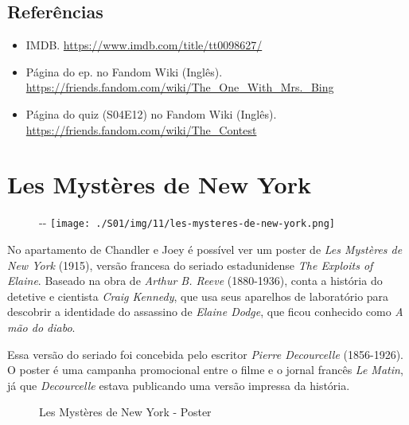 \hypertarget{referuxeancias-1}{%
\subsection{Referências}\label{referuxeancias-1}}

\begin{itemize}
\tightlist
\item
  \sloppy IMDB. \url{https://www.imdb.com/title/tt0098627/}
\item
  \sloppy Página do ep. no Fandom Wiki (Inglês). \url{https://friends.fandom.com/wiki/The_One_With_Mrs._Bing}
\item
  \sloppy Página do quiz (S04E12) no Fandom Wiki (Inglês). \url{https://friends.fandom.com/wiki/The_Contest}
\end{itemize}

\hypertarget{les-mystuxe8res-de-new-york}{%
\section{Les Mystères de New York}\label{les-mystuxe8res-de-new-york}}

\begin{figure}[!ht]
  \begin{adjustwidth}{-\oddsidemargin-1in}{-\rightmargin}
    \centering
    \texttt{[image: ./S01/img/11/les-mysteres-de-new-york.png]}
  \end{adjustwidth}
\end{figure}

No apartamento de Chandler e Joey é possível ver um poster de \emph{Les
Mystères de New York} (1915), versão francesa do seriado estadunidense
\emph{The Exploits of Elaine}. Baseado na obra de \emph{Arthur B. Reeve}
(1880-1936), conta a história do detetive e cientista \emph{Craig
Kennedy}, que usa seus aparelhos de laboratório para descobrir a
identidade do assassino de \emph{Elaine Dodge}, que ficou conhecido como
\emph{A mão do diabo}.

Essa versão do seriado foi concebida pelo escritor \emph{Pierre
Decourcelle} (1856-1926). O poster é uma campanha promocional entre o
filme e o jornal francês \emph{Le Matin}, já que \emph{Decourcelle}
estava publicando uma versão impressa da história.

\begin{figure}
  \centering
    \caption{Les Mystères de New York - Poster\label{fig:les-myst-res-de-new-york-poster}}
\end{figure}

